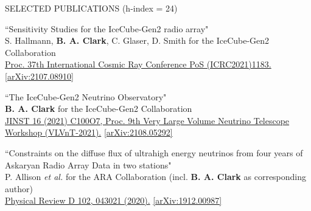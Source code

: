\documentclass{resume} %
\begin{document}
\begin{rSection}{SELECTED PUBLICATIONS (h-index = 24)}
\begin{etaremune}
  \item ``Sensitivity Studies for the IceCube-Gen2 radio array" \\
 S. Hallmann, \textbf{B. A. Clark}, C. Glaser, D. Smith for the IceCube-Gen2 Collaboration \\ \href{https://doi.org/10.22323/1.395.1183}{Proc. 37th International Cosmic Ray Conference PoS (ICRC2021)1183.}  \href{https://arxiv.org/abs/2107.08910}{[arXiv:2107.08910]}


\item ``The IceCube-Gen2 Neutrino Observatory" \\
\textbf{B. A. Clark} for the IceCube-Gen2 Collaboration \\ \href{https://doi.org/10.1088/1748-0221/16/10/C10007}{JINST 16 (2021) C100O7, Proc. 9th Very Large Volume Neutrino Telescope Workshop (VLVnT-2021).}  \href{https://arxiv.org/abs/2108.05292}{[arXiv:2108.05292]}



  \item ``Constraints on the diffuse flux of ultrahigh energy neutrinos from four years of Askaryan Radio Array Data in two stations" \\
 P. Allison {\it et al.} for the ARA Collaboration (incl. \textbf{B. A. Clark} as corresponding author)\\ \href{https://doi.org/10.1103/PhysRevD.102.043021}{Physical Review D 102, 043021 (2020).}  \href{https://arxiv.org/abs/1912.00987}{[arXiv:1912.00987]}



\end{etaremune}
\end{rSection}
\end{document}
